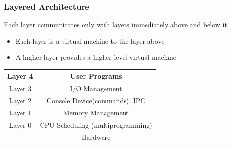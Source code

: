 \documentclass[11pt]{article}
\theoremstyle{definition}
\begin{document}
        \subsubsection{Layered Architecture}
            \hspace{1cm} Each layer communicates only with layers immediately above and below it
                \begin{itemize}
                    \item Each layer is a virtual machine to the layer above
                    \item A higher layer provides a higher-level virtual machine
                \end{itemize}
            \hspace{1cm} \begin{tabular}{|c|c|}
            \hline
                Layer 4 &  User Programs \\ \hline
                Layer 3 & I/O Management \\ \hline
                Layer 2 & Console Device(commands), IPC \\ \hline
                Layer 1 & Memory Management \\ \hline
                Layer 0 & CPU Scheduling (multiprogramming) \\ \hline
                        & Hardware \\ \hline
                
            \end{tabular}    
\end{document}
